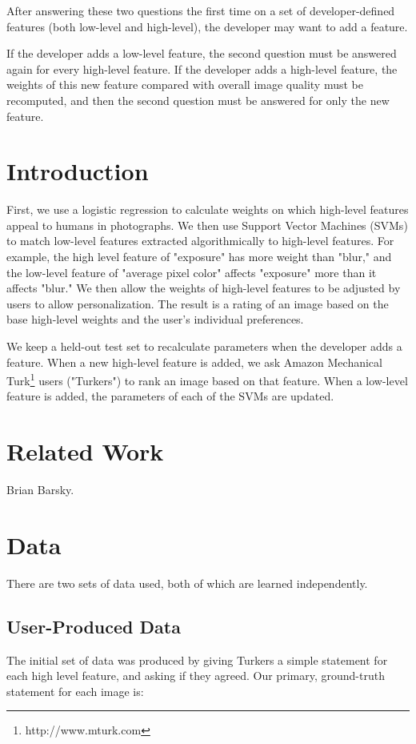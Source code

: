 \documentclass[10pt,twocolumn]{article}
\begin{document}
After answering these two questions the first time on a set of developer-defined features (both low-level and high-level), the developer may want to add a feature.

If the developer adds a low-level feature, the second question must be answered again for every high-level feature. If the developer adds a high-level feature, the weights of this new feature compared with overall image quality must be recomputed, and then the second question must be answered for only the new feature.

\section{Introduction}
First, we use a logistic regression to calculate weights on which high-level features appeal to humans in photographs. We then use Support Vector Machines (SVMs) to match low-level features extracted algorithmically to high-level features. For example, the high level feature of "exposure" has more weight than "blur," and the low-level feature of "average pixel color" affects "exposure" more than it affects "blur." We then allow the weights of high-level features to be adjusted by users to allow personalization. The result is a rating of an image based on the base high-level weights and the user's individual preferences.

We keep a held-out test set to recalculate parameters when the developer adds a feature. When a new high-level feature is added, we ask Amazon Mechanical Turk\footnote{http://www.mturk.com} users ("Turkers") to rank an image based on that feature. When a low-level feature is added, the parameters of each of the SVMs are updated.

\section{Related Work}
Brian Barsky.

\section{Data}

There are two sets of data used, both of which are learned independently.

\subsection{User-Produced Data}
The initial set of data was produced by giving Turkers a simple statement for each high level feature, and asking if they agreed. Our primary, ground-truth statement for each image is:
\end{document}
